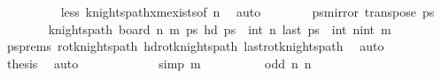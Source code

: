 \begin{isabellebody}
\ \ \ \ \ \ \ \ \isamarkupfalse%
\ less\ knights{\isacharunderscore}{\kern0pt}path{\isacharunderscore}{\kern0pt}{}xm{\isacharunderscore}{\kern0pt}exists{\isacharbrackleft}{\kern0pt}of\ n{\isacharbrackright}{\kern0pt}\ \isamarkupfalse%
\ auto\isanewline
\ \ \ \ \ \ \isamarkupfalse%
\ {\isacharquery}{\kern0pt}ps{\isacharprime}{\kern0pt}{\isacharequal}{\kern0pt}{\isachardoublequoteopen}mirror{}\ {\isacharparenleft}{\kern0pt}transpose\ ps{\isacharparenright}{\kern0pt}{\isachardoublequoteclose}\isanewline
\ \ \ \ \ \ \isamarkupfalse%
\ {\isachardoublequoteopen}knights{\isacharunderscore}{\kern0pt}path\ {\isacharparenleft}{\kern0pt}board\ n\ m{\isacharparenright}{\kern0pt}\ {\isacharquery}{\kern0pt}ps{\isacharprime}{\kern0pt}{\isachardoublequoteclose}\ {\isachardoublequoteopen}hd\ {\isacharquery}{\kern0pt}ps{\isacharprime}{\kern0pt}\ {\isacharequal}{\kern0pt}\ {\isacharparenleft}{\kern0pt}int\ n{\isacharcomma}{\kern0pt}{}{\isacharparenright}{\kern0pt}{\isachardoublequoteclose}\ {\isachardoublequoteopen}last\ {\isacharquery}{\kern0pt}ps{\isacharprime}{\kern0pt}\ {\isacharequal}{\kern0pt}\ {\isacharparenleft}{\kern0pt}int\ n{\isacharminus}{\kern0pt}{}{\isacharcomma}{\kern0pt}int\ m{\isacharminus}{\kern0pt}{}{\isacharparenright}{\kern0pt}{\isachardoublequoteclose}\isanewline
\ \ \ \ \ \ \ \ \isamarkupfalse%
\ ps{\isacharunderscore}{\kern0pt}prems\ rot{}{}{\isacharunderscore}{\kern0pt}knights{\isacharunderscore}{\kern0pt}path\ hd{\isacharunderscore}{\kern0pt}rot{}{}{\isacharunderscore}{\kern0pt}knights{\isacharunderscore}{\kern0pt}path\ last{\isacharunderscore}{\kern0pt}rot{}{}{\isacharunderscore}{\kern0pt}knights{\isacharunderscore}{\kern0pt}path\ \isamarkupfalse%
\ auto\isanewline
\ \ \ \ \ \ \isamarkupfalse%
\ \isamarkupfalse%
\ {\isacharquery}{\kern0pt}thesis\ \isamarkupfalse%
\ auto\isanewline
\ \ \ \ \isamarkupfalse%
\isanewline
\ \ \ \ \ \ \isamarkupfalse%
\ {\isacharbrackleft}{\kern0pt}simp{\isacharbrackright}{\kern0pt}{\isacharcolon}{\kern0pt}\ {\isachardoublequoteopen}m\ {\isacharequal}{\kern0pt}\ {}{\isachardoublequoteclose}\isanewline
\ \ \ \ \ \ \isamarkupfalse%
\ {\isachardoublequoteopen}odd\ n{\isachardoublequoteclose}\ {\isachardoublequoteopen}n\ {\isasymge}\ {}{\isachardoublequoteclose}\ \isamarkupfalse%

\end{isabellebody}
